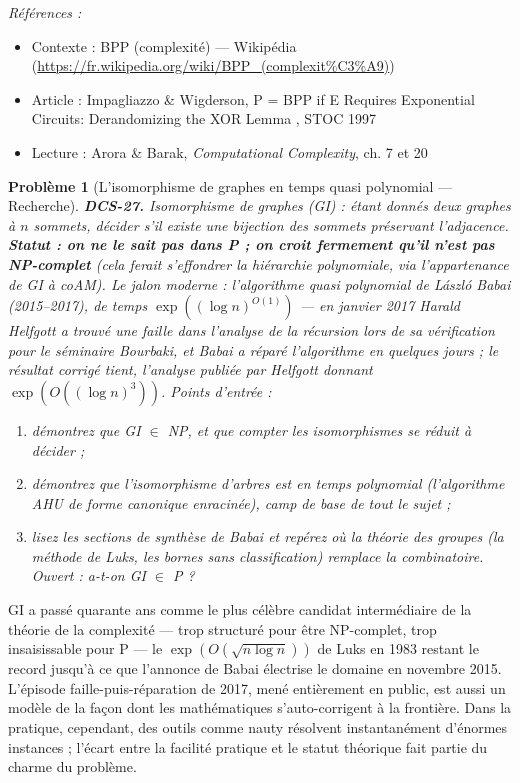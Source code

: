 \documentclass[11pt]{article}
\newtheorem{problem}{Problème}
\newenvironment{refs}{\par\small\noindent\emph{Références :}\begin{itemize}\setlength\itemsep{0pt}}{\end{itemize}\normalsize}
\begin{document}
\begin{refs}
\item Contexte : BPP (complexité) --- Wikipédia (\url{https://fr.wikipedia.org/wiki/BPP_(complexit%C3%A9)})
\item Article : Impagliazzo \& Wigderson, \og{} P = BPP if E Requires Exponential Circuits: Derandomizing the XOR Lemma \fg{}, STOC 1997
\item Lecture : Arora \& Barak, \textit{Computational Complexity}, ch. 7 et 20
\end{refs}

\bigskip

\begin{problem}[{L'isomorphisme de graphes en temps quasi polynomial --- Recherche}]
\textbf{DCS-27.} Isomorphisme de graphes (GI) : étant donnés deux graphes à $n$ sommets, décider s'il existe une bijection des sommets préservant l'adjacence. \textbf{Statut : on ne le sait pas dans P ; on croit fermement qu'il n'est pas NP-complet} (cela ferait s'effondrer la hiérarchie polynomiale, via l'appartenance de GI à coAM). Le jalon moderne : l'algorithme quasi polynomial de László Babai (2015--2017), de temps $\exp((\log n)^{O(1)})$ --- en janvier 2017 Harald Helfgott a trouvé une faille dans l'analyse de la récursion lors de sa vérification pour le séminaire Bourbaki, et Babai a réparé l'algorithme en quelques jours ; le résultat corrigé tient, l'analyse publiée par Helfgott donnant $\exp(O((\log n)^3))$. Points d'entrée :
\begin{enumerate}
\item[(a)] démontrez que GI $\in$ NP, et que compter les isomorphismes se réduit à décider ;
\item[(b)] démontrez que l'isomorphisme d'arbres est en temps polynomial (l'algorithme AHU de forme canonique enracinée), camp de base de tout le sujet ;
\item[(c)] lisez les sections de synthèse de Babai et repérez où la théorie des groupes (la méthode de Luks, les bornes sans classification) remplace la combinatoire. Ouvert : a-t-on GI $\in$ P ?
\end{enumerate}

\end{problem}

\noindent GI a passé quarante ans comme le plus célèbre candidat \og{} intermédiaire \fg{} de la théorie de la complexité --- trop structuré pour être NP-complet, trop insaisissable pour P --- le $\exp(O(\sqrt{n \log n}))$ de Luks en 1983 restant le record jusqu'à ce que l'annonce de Babai électrise le domaine en novembre 2015. L'épisode faille-puis-réparation de 2017, mené entièrement en public, est aussi un modèle de la façon dont les mathématiques s'auto-corrigent à la frontière. Dans la pratique, cependant, des outils comme nauty résolvent instantanément d'énormes instances ; l'écart entre la facilité pratique et le statut théorique fait partie du charme du problème.
\end{document}
